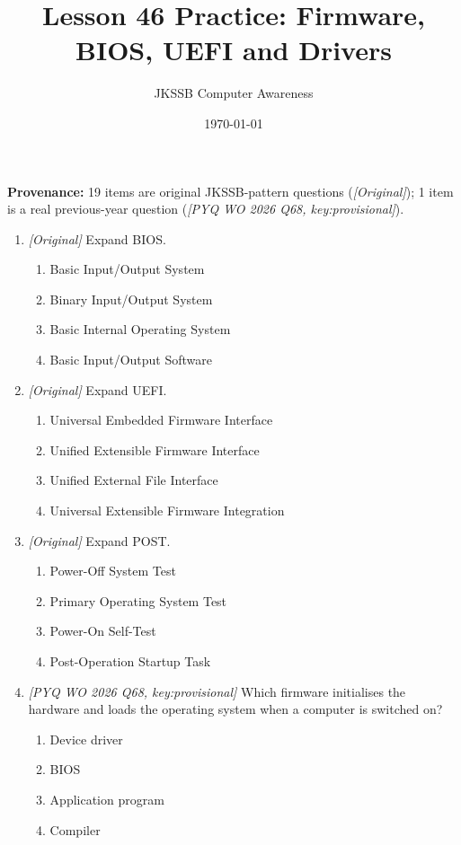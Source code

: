 \documentclass[11pt]{article}
\title{Lesson 46 Practice: Firmware, BIOS, UEFI and Drivers}
\author{JKSSB Computer Awareness}
\date{\today}
\begin{document}
\maketitle
\noindent\textbf{Provenance:} 19 items are original JKSSB-pattern questions
(\textit{[Original]}); 1 item is a real previous-year question
(\textit{[PYQ WO 2026 Q68, key:provisional]}).

\begin{enumerate}[label=\textbf{Q\arabic*.}, leftmargin=*]
\item \textit{[Original]} Expand BIOS.
  \begin{enumerate}[label=\Alph*.]
    \item Basic Input/Output System
    \item Binary Input/Output System
    \item Basic Internal Operating System
    \item Basic Input/Output Software
  \end{enumerate}
\item \textit{[Original]} Expand UEFI.
  \begin{enumerate}[label=\Alph*.]
    \item Universal Embedded Firmware Interface
    \item Unified Extensible Firmware Interface
    \item Unified External File Interface
    \item Universal Extensible Firmware Integration
  \end{enumerate}
\item \textit{[Original]} Expand POST.
  \begin{enumerate}[label=\Alph*.]
    \item Power-Off System Test
    \item Primary Operating System Test
    \item Power-On Self-Test
    \item Post-Operation Startup Task
  \end{enumerate}
\item \textit{[PYQ WO 2026 Q68, key:provisional]} Which firmware initialises
  the hardware and loads the operating system when a computer is switched on?
  \begin{enumerate}[label=\Alph*.]
    \item Device driver
    \item BIOS
    \item Application program
    \item Compiler

\end{enumerate}
\end{enumerate}
\end{document}
